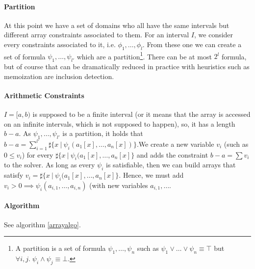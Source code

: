 \documentclass[]{article}
\begin{document}
\paragraph{Partition}\label{partition}

At this point we have a set of domains who all have the same intervals
but different array constraints associated to them. For an interval
$I$, we consider every constraints associated to it, i.e.
$\phi_1, \ldots, \phi_l$. From these one we can create a set of formula
$\psi_1, \ldots, \psi_{l'}$ which are a
partition\footnote{A partition is a set of formula $\psi_1, \ldots, \psi_n$ such as $\psi_1 \lor \ldots \lor \psi_n \equiv \top$ but $\forall i, j. \; \psi_i \land \psi_j \equiv \bot$.}.
There can be at most $2^l$ formula, but of course that can be
dramatically reduced in practice with heuristics such as memoization are
inclusion detection.

\paragraph{Arithmetic Constraints}\label{arithmetic-constraints}

$I = [a, b)$ is supposed to be a finite interval (or it means that the
array is accessed on an infinite intervals, which is not supposed to
happen), so, it has a length $b - a$. As $\psi_1, \ldots, \psi_{l'}$ is a
partition, it holds that
$b - a = \sum\limits_{i = 1}^{l'} \sharp\{x \ |\ \psi_i(a_1[x], \ldots, a_n[x])\}$.We
create a new variable $v_i$ (such as $0 \le v_i$) for every
$\sharp\{x\ |\ \psi_i(a_1[x], \ldots, a_n[x]\}$ and adds the constraint
$b - a = \sum v_i$ to the solver. As long as every $\psi_i$ is
satisfiable, then we can build arrays that satisfy
$v_i = \sharp\{x\ |\ \psi_i(a_1[x], \ldots, a_n[x]\}$. Hence, we must add
$v_i > 0 \implies \psi_i(a_{i, 1}, \ldots, a_{i, n})$ (with new variables
$a_{i, 1}, \ldots$.

\paragraph{Algorithm}\label{algorithm-1}

See algorithm \ref{arrayalgo}.
\end{document}
